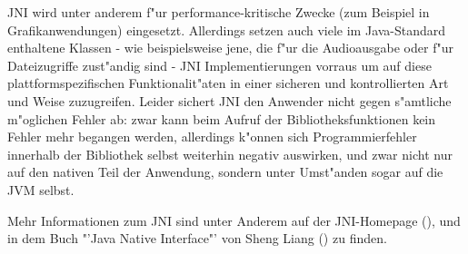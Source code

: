 JNI wird unter anderem f"ur performance-kritische Zwecke (zum Beispiel in Grafikanwendungen) eingesetzt. Allerdings setzen auch viele im Java-Standard enthaltene
Klassen - wie beispielsweise jene, die f"ur die Audioausgabe oder f"ur Dateizugriffe zust"andig sind - JNI Implementierungen vorraus um auf diese
plattformspezifischen Funktionalit"aten in einer sicheren und kontrollierten Art und Weise zuzugreifen. Leider sichert JNI den Anwender nicht gegen s"amtliche m"oglichen
Fehler ab: zwar kann beim Aufruf der Bibliotheksfunktionen kein Fehler mehr begangen werden, allerdings k"onnen sich Programmierfehler innerhalb der
Bibliothek selbst weiterhin negativ auswirken, und zwar nicht nur auf den nativen Teil der Anwendung, sondern unter Umst"anden sogar auf die JVM selbst.

Mehr Informationen zum JNI sind unter Anderem auf der JNI-Homepage (\cite{JNIHP}), und in dem Buch "'Java Native Interface"' von Sheng Liang (\cite{JNIBOOK}) zu finden.


